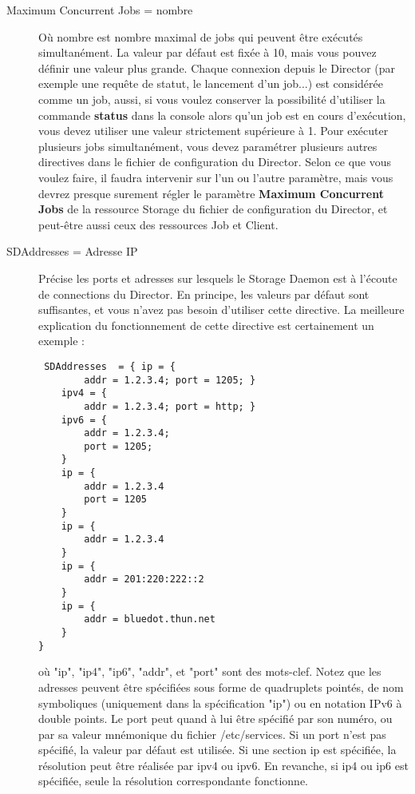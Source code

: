 \begin{description}
\item [Maximum Concurrent Jobs = \lt{}nombre\gt{}]
   O\`u \lt{}nombre\gt{} est nombre maximal de jobs qui peuvent \^etre ex\'ecut\'es 
   simultan\'ement. La valeur par d\'efaut est fix\'ee \`a 10, mais vous pouvez d\'efinir 
   une valeur plus grande. Chaque connexion depuis le Director (par exemple 
   une requ\^ete de statut, le lancement d'un job...) est consid\'er\'ee comme un job, 
   aussi, si vous voulez conserver la possibilit\'e d'utiliser la commande 
   {\bf status} dans la console alors qu'un job est en cours d'ex\'ecution, vous 
   devez utiliser une valeur strictement sup\'erieure \`a 1. Pour ex\'ecuter plusieurs 
   jobs simultan\'ement, vous devez param\'etrer plusieurs autres directives dans le 
   fichier de configuration du Director. Selon ce que vous voulez faire, il faudra 
   intervenir sur l'un ou l'autre param\`etre, mais vous devrez presque surement 
   r\'egler le param\`etre {\bf Maximum Concurrent Jobs} de la ressource Storage du 
   fichier de configuration du Director, et peut-\^etre aussi ceux des ressources 
   Job et Client.
   
\item [SDAddresses = \lt{}Adresse IP\gt{}]
   Pr\'ecise les ports et adresses sur lesquels le Storage Daemon est \`a 
   l'\'ecoute de connections du Director. En principe, les valeurs par d\'efaut sont 
   suffisantes, et vous n'avez pas besoin d'utiliser cette directive. La meilleure 
   explication du fonctionnement de cette directive est certainement un exemple :
   
\footnotesize
\begin{verbatim}
 SDAddresses  = { ip = {
        addr = 1.2.3.4; port = 1205; }
    ipv4 = {
        addr = 1.2.3.4; port = http; }
    ipv6 = {
        addr = 1.2.3.4;
        port = 1205;
    }
    ip = {
        addr = 1.2.3.4
        port = 1205
    }
    ip = {
        addr = 1.2.3.4
    }
    ip = {
        addr = 201:220:222::2
    }
    ip = {
        addr = bluedot.thun.net
    }
}
\end{verbatim}
\normalsize

o\`u "ip", "ip4", "ip6", "addr", et "port" sont des mots-clef. Notez que les adresses 
peuvent \^etre sp\'ecifi\'ees sous forme de quadruplets point\'es, de nom symboliques 
(uniquement dans la sp\'ecification "ip") ou en notation IPv6 \`a double points. Le port 
peut quand \`a lui \^etre sp\'ecifi\'e par son num\'ero, ou par sa valeur mn\'emonique du 
fichier /etc/services. Si un port n'est pas sp\'ecifi\'e, la valeur par d\'efaut est 
utilis\'ee. Si une section ip est sp\'ecifi\'ee, la r\'esolution peut \^etre r\'ealis\'ee 
par ipv4 ou ipv6. En revanche, si ip4 ou ip6 est sp\'ecifi\'ee, seule la r\'esolution 
correspondante fonctionne.


\end{description}
